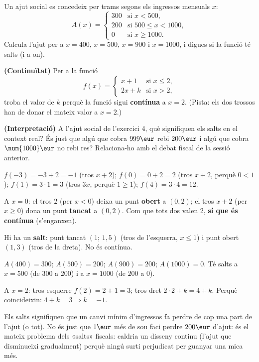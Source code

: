 \begin{exercicis}
\begin{exlist}
  \item Un ajut social es concedeix per trams segons els ingressos mensuals $x$:
        \[
        A(x)=
        \begin{cases}
        300 & \text{si } x<500,\\[2pt]
        200 & \text{si } 500\le x<1000,\\[2pt]
        0 & \text{si } x\ge 1000.
        \end{cases}
        \]
        Calcula l'ajut per a $x=400$, $x=500$, $x=900$ i $x=1000$, i digues si la
        funció té salts (i a on).
  \item \textbf{(Continuïtat)} Per a la funció
        \[
        f(x)=
        \begin{cases}
        x+1 & \text{si } x\le 2,\\[2pt]
        2x+k & \text{si } x>2,
        \end{cases}
        \]
        troba el valor de $k$ perquè la funció sigui \textbf{contínua} a $x=2$.
        (Pista: els dos trossos han de donar el mateix valor a $x=2$.)
  \item \textbf{(Interpretació)} A l'ajut social de l'exercici 4, què signifiquen els
        salts en el context real? És just que algú que cobra $999\eur$ rebi $200\eur$
        i algú que cobra $\num{1000}\eur$ no rebi res? Relaciona-ho amb el debat fiscal
        de la sessió anterior.
\end{exlist}
\end{exercicis}

\begin{solucions}
\begin{sollist}
  \item $f(-3)=-3+2=-1$ (tros $x+2$); $f(0)=0+2=2$ (tros $x+2$, perquè $0<1$);
        $f(1)=3\cdot 1=3$ (tros $3x$, perquè $1\ge 1$); $f(4)=3\cdot 4=12$.
  \item A $x=0$: el tros $2$ (per $x<0$) deixa un punt \textbf{obert} a $(0,2)$; el
        tros $x+2$ (per $x\ge 0$) dona un punt \textbf{tancat} a $(0,2)$. Com que tots
        dos valen $2$, \textbf{sí que és contínua} (s'enganxen).
  \item Hi ha un \textbf{salt}: punt tancat $(1;\,1,5)$ (tros de l'esquerra, $x\le 1$)
        i punt obert $(1,3)$ (tros de la dreta). No és contínua.
  \item $A(400)=300$; $A(500)=200$; $A(900)=200$; $A(1000)=0$. Té salts a $x=500$
        (de $300$ a $200$) i a $x=\num{1000}$ (de $200$ a $0$).
  \item A $x=2$: tros esquerre $f(2)=2+1=3$; tros dret $2\cdot 2+k=4+k$. Perquè
        coincideixin: $4+k=3 \Rightarrow k=-1$.
  \item Els salts signifiquen que un canvi mínim d'ingressos fa perdre de cop una part
        de l'ajut (o tot). No és just que $1\eur$ més de sou faci perdre $200\eur$
        d'ajut: és el mateix problema dels «salts» fiscals: caldria un disseny continu
        (l'ajut que disminueixi gradualment) perquè ningú surti perjudicat per guanyar
        una mica més.
\end{sollist}
\end{solucions}
